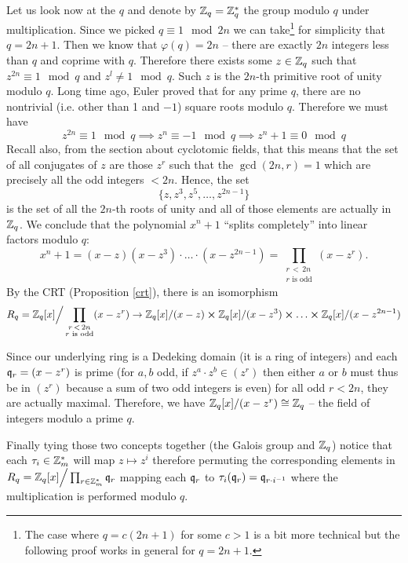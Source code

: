 Let us look now at the $q$ and denote by $\mathbb{Z}_q = \mathbb{Z}_q^*$ the group modulo $q$ under multiplication. Since we picked $q \equiv 1 \mod 2n$ we can take\footnote{The case where $q = c(2n+1)$ for some $c > 1$ is a bit more technical but the following proof works in general for $q = 2n+1$.} for simplicity that $q = 2n + 1$. Then we know that $\varphi(q) = 2n$ -- there are exactly $2n$ integers less than $q$ and coprime with $q$. Therefore there exists some $z \in \mathbb{Z}_q$ such that $z^{2n} \equiv 1 \mod q$ and $z^l \neq 1 \mod q$. Such $z$ is the $2n$-th primitive root of unity modulo $q$. Long time ago, Euler proved that for any prime $q$, there are no nontrivial (i.e. other than 1 and $-1$) square roots modulo $q$. Therefore we must have
\[ z^{2n} \equiv 1 \mod q \implies z^n \equiv -1 \mod q \implies z^n + 1 \equiv 0 \mod q\]
Recall also, from the section about cyclotomic fields, that this means that the set of all conjugates of $z$ are those $z^r$ such that the $\gcd(2n, r) = 1$ which are precisely all the odd integers $< 2n$. Hence, the set
\[ \{z, z^3, z^5, \ldots, z^{2n-1} \} \]
is the set of all the $2n$-th roots of unity and all of those elements are actually in $\mathbb{Z}_q$. We conclude that the polynomial $x^n +1$ ``splits completely'' into linear factors modulo $q$:
\[ x^n + 1 = (x-z)(x-z^3) \cdot \ldots \cdot (x-z^{2n-1}) = \prod_{\substack{r \, <\, 2n \\ r \text{ is odd}}} (x-z^r). \]
By the CRT (Proposition \ref{crt}), there is an isomorphism
\[ R_q = \mathbb{Z}_q[x] \Big/\prod_{\substack{r \, < \, 2n \\ r \text{ is odd}}}(x-z^r) \rightarrow  \mathbb{Z}_q[x]/(x-z) \cross  \mathbb{Z}_q[x]/(x-z^3) \cross \ldots \cross  \mathbb{Z}_q[x]/(x-z^{2n-1})\]

Since our underlying ring is a Dedeking domain (it is a ring of integers) and each $\mathfrak{q}_r = (x-z^r)$ is prime (for $a,b$ odd, if $z^a \cdot z^b \in (z^r)$ then either $a$ or $b$ must thus be in $(z^r)$ because a sum of two odd integers is even) for all odd $r < 2n$, they are actually maximal. Therefore, we have $\mathbb{Z}_q[x]/(x-z^r) \cong \mathbb{Z}_q$ -- the field of integers modulo a prime $q$. 

Finally tying those two concepts together (the Galois group and $\mathbb{Z}_q$) notice that each $\tau_i \in \mathbb{Z}_m^*$ will map $z \mapsto z^i$ therefore permuting the corresponding elements in $R_q = \mathbb{Z}_q[x] \Big/\prod_{r \in \mathbb{Z}_m^*}\mathfrak{q}_r$ mapping each $\mathfrak{q}_r$ to $\tau_i(\mathfrak{q}_r) = \mathfrak{q}_{r\cdot i^{-1}}$ where the multiplication is performed modulo $q$.

